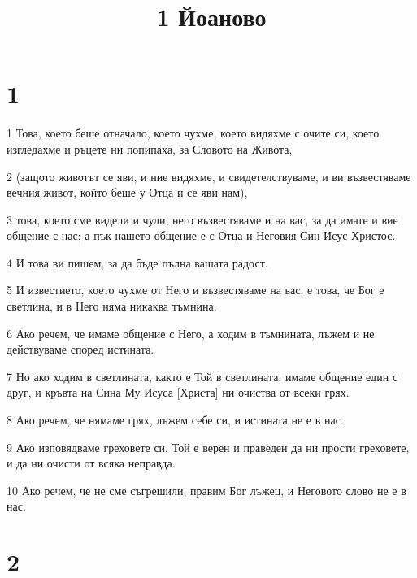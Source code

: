 

\title{1 Йоаново}


\chapter{1}

\par 1 Това, което беше отначало, което чухме, което видяхме с очите си, което изгледахме и ръцете ни попипаха, за Словото на Живота,
\par 2 (защото животът се яви, и ние видяхме, и свидетелствуваме, и ви възвестяваме вечния живот, който беше у Отца и се яви нам),
\par 3 това, което сме видели и чули, него възвестяваме и на вас, за да имате и вие общение с нас; а пък нашето общение е с Отца и Неговия Син Исус Христос.
\par 4 И това ви пишем, за да бъде пълна вашата радост.
\par 5 И известието, което чухме от Него и възвестяваме на вас, е това, че Бог е светлина, и в Него няма никаква тъмнина.
\par 6 Ако речем, че имаме общение с Него, а ходим в тъмнината, лъжем и не действуваме според истината.
\par 7 Но ако ходим в светлината, както е Той в светлината, имаме общение един с друг, и кръвта на Сина Му Исуса [Христа] ни очиства от всеки грях.
\par 8 Ако речем, че нямаме грях, лъжем себе си, и истината не е в нас.
\par 9 Ако изповядваме греховете си, Той е верен и праведен да ни прости греховете, и да ни очисти от всяка неправда.
\par 10 Ако речем, че не сме съгрешили, правим Бог лъжец, и Неговото слово не е в нас.

\chapter{2}

